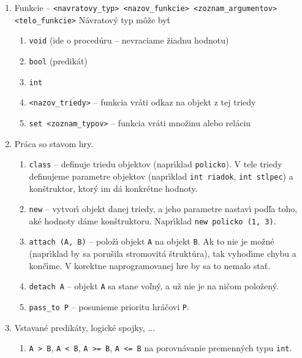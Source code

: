 \documentclass[a4paper,12pt]{article}
\begin{document}
\begin{enumerate}
    \item Funkcie -- \verb|<navratovy_typ> <nazov_funkcie> <zoznam_argumentov> <telo_funkcie>|
    N\'{a}vratov\'{y} typ m\^{o}\v{z}e by\v{t}
    \begin{enumerate}
        \item \verb|void| (ide o proced\'{u}ru -- nevraciame \v{z}iadnu hodnotu)
        \item \verb|bool| (predik\'{a}t)
        \item \verb|int|
        \item \verb|<nazov_triedy>| -- funkcia vr\'{a}ti odkaz na objekt z tej triedy
        \item \verb|set <zoznam_typov>| -- funkcia vr\'{a}ti mno\v{z}inu alebo rel\'{a}ciu
    \end{enumerate}
    \item Pr\'{a}ca so stavom hry.
    \begin{enumerate}
        \item \verb|class| -- definuje triedu objektov (napr\'{\i}klad \verb|policko|).
        V tele triedy definujeme parametre objektov (napr\'{\i}klad \verb|int riadok|,
        \verb|int stlpec|) a kon\v{s}truktor, ktor\'{y} im d\'{a} konkr\'{e}tne hodnoty.
        \item \verb|new| -- vytvor\'{\i} objekt danej triedy, a jeho parametre
        nastav\'{\i} pod\v{l}a toho, ak\'{e} hodnoty d\'{a}me kon\v{s}truktoru.
        Napr\'{\i}klad \verb|new policko (1, 3)|.
        \item \verb|attach (A, B)| -- polo\v{z}\'{\i} objekt \verb|A| na objekt
        \verb|B|. Ak to nie je mo\v{z}n\'{e} (napr\'{\i}klad by sa poru\v{s}ila
        stromovit\'{a} \v{s}trukt\'{u}ra), tak vyhod\'{\i}me chybu a kon\v{c}\'{\i}me.
        V korektne naprogramovanej hre by sa to nemalo sta\v{t}.
        \item \verb|detach A| -- objekt \verb|A| sa stane vo\v{l}n\'{y}, a u\v{z}
        nie je na ni\v{c}om polo\v{z}en\'{y}.
        \item \verb|pass_to P| -- posunieme prioritu hr\'{a}\v{c}ovi \verb|P|.
    \end{enumerate}
    \item Vstavan\'{e} predik\'{a}ty, logick\'{e} spojky, ...
    \begin{enumerate}
        \item \verb|A > B|, \verb|A < B|, \verb|A >= B|, \verb|A <= B| na porovn\'{a}vanie
        premenn\'{y}ch typu \verb|int|.

\end{enumerate}
\end{enumerate}
\end{document}
